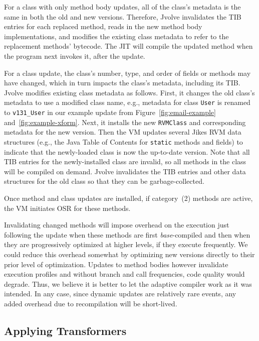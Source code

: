 \documentclass[9pt]{sigplanconf}
\newcommand{\DSU}{{\sc Jvolve}}
\newcommand{\VMClass}{\texttt{RVMClass}}
\newcommand{\JikesRVM}{Jikes RVM}
\begin{document}
For a class with only method body updates, all of the class's metadata
is the same in both the old and new versions.  Therefore, \DSU{} invalidates the TIB entries for each replaced method, 
reads in the new method body implementations, and modifies the
existing class metadata to refer to the replacement methods' bytecode.  The JIT
will compile the updated method when the program next invokes it, after the
update.

For a class update, the class's number, type, and order of fields or
methods may have changed, which in turn impacts the class's metadata,
including its TIB\@.  \DSU{} modifies existing class metadata as
follows.  First, it changes the old class's metadata to use a
modified class name, e.g., metadata for class \texttt{User} is renamed
to \texttt{v131\_User} in our example update from
Figure~\ref{fig:email-example} and~\ref{fig:example-xform}.  Next, it
installs the new \VMClass{} and corresponding metadata
for the new version. Then the VM updates several \JikesRVM{} data
structures (e.g., the Java Table of Contents for
{\tt static} methods and fields) to indicate that the newly-loaded
class is now the up-to-date version.  Note that all TIB entries for
the newly-installed class are invalid, so all methods in the class
will be compiled on demand.  \DSU{}  invalidates the
TIB entries and other data structures for the old class so that they
can be garbage-collected.  

Once method and class updates are installed, if category~(2) methods are
active, the VM initiates OSR for these methods. 

Invalidating changed methods will impose overhead on the execution
just following the update when these methods are first
\emph{base}-compiled and then when they are progressively optimized at
higher levels, if they execute frequently.  We could reduce this
overhead somewhat by optimizing new versions directly to their prior
level of optimization.  Updates to method bodies however invalidate
execution profiles and  without branch and call frequencies, code quality
would degrade. Thus, we believe it is better to let the adaptive
compiler work as it was intended.  In any case, since dynamic updates
are relatively rare events, any added overhead due to recompilation
will be short-lived.

\subsection{Applying Transformers}
\label{sec:xformers}
\end{document}
